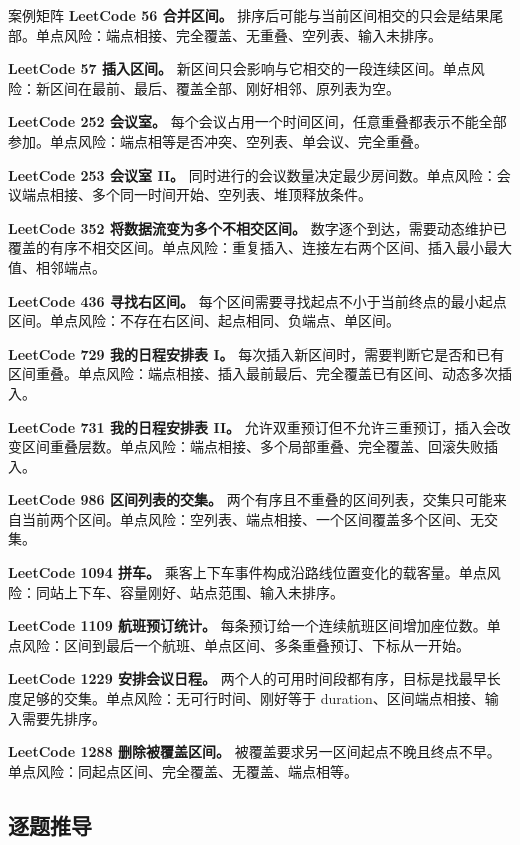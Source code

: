\begin{principlebox}{案例矩阵}
\textbf{LeetCode 56 合并区间。}
排序后可能与当前区间相交的只会是结果尾部。单点风险：端点相接、完全覆盖、无重叠、空列表、输入未排序。

\textbf{LeetCode 57 插入区间。}
新区间只会影响与它相交的一段连续区间。单点风险：新区间在最前、最后、覆盖全部、刚好相邻、原列表为空。

\textbf{LeetCode 252 会议室。}
每个会议占用一个时间区间，任意重叠都表示不能全部参加。单点风险：端点相等是否冲突、空列表、单会议、完全重叠。

\textbf{LeetCode 253 会议室 II。}
同时进行的会议数量决定最少房间数。单点风险：会议端点相接、多个同一时间开始、空列表、堆顶释放条件。

\textbf{LeetCode 352 将数据流变为多个不相交区间。}
数字逐个到达，需要动态维护已覆盖的有序不相交区间。单点风险：重复插入、连接左右两个区间、插入最小最大值、相邻端点。

\textbf{LeetCode 436 寻找右区间。}
每个区间需要寻找起点不小于当前终点的最小起点区间。单点风险：不存在右区间、起点相同、负端点、单区间。

\textbf{LeetCode 729 我的日程安排表 I。}
每次插入新区间时，需要判断它是否和已有区间重叠。单点风险：端点相接、插入最前最后、完全覆盖已有区间、动态多次插入。

\textbf{LeetCode 731 我的日程安排表 II。}
允许双重预订但不允许三重预订，插入会改变区间重叠层数。单点风险：端点相接、多个局部重叠、完全覆盖、回滚失败插入。

\textbf{LeetCode 986 区间列表的交集。}
两个有序且不重叠的区间列表，交集只可能来自当前两个区间。单点风险：空列表、端点相接、一个区间覆盖多个区间、无交集。

\textbf{LeetCode 1094 拼车。}
乘客上下车事件构成沿路线位置变化的载客量。单点风险：同站上下车、容量刚好、站点范围、输入未排序。

\textbf{LeetCode 1109 航班预订统计。}
每条预订给一个连续航班区间增加座位数。单点风险：区间到最后一个航班、单点区间、多条重叠预订、下标从一开始。

\textbf{LeetCode 1229 安排会议日程。}
两个人的可用时间段都有序，目标是找最早长度足够的交集。单点风险：无可行时间、刚好等于 duration、区间端点相接、输入需要先排序。

\textbf{LeetCode 1288 删除被覆盖区间。}
被覆盖要求另一区间起点不晚且终点不早。单点风险：同起点区间、完全覆盖、无覆盖、端点相等。

\end{principlebox}

\subsection{逐题推导}

